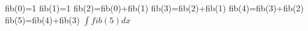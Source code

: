 \documentclass[11pt]{article}
\begin{document}
    \delayed fib(0)=1
    \delayed fib(1)=1
    \delayed fib(2)=fib(0)+fib(1)
    \delayed fib(3)=fib(2)+fib(1)
    \delayed fib(4)=fib(3)+fib(2)
    \delayed fib(5)=fib(4)+fib(3)
    $\int fib(5) dx$
\end{document}
